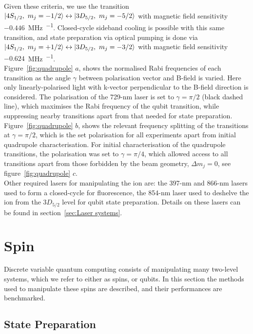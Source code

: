     Given these criteria, we use the transition $\ket{4S_{1/2},~m_j = -1/2} \leftrightarrow \ket{3D_{5/2},~m_j = -5/2}$ with magnetic field sensitivity 
    $-0.446$~\unit{\MHz\per\gauss}. Closed-cycle sideband cooling is possible with this same transition, and state preparation via optical pumping is done via $\ket{4S_{1/2},~m_j = +1/2} \leftrightarrow \ket{3D_{5/2},~m_j = -3/2}$ with magnetic field sensitivity $-0.624$~\unit{\MHz\per\gauss}. \\
    Figure~\ref{fig:quadrupole} $a$, shows the normalised Rabi frequencies of each transition as the angle $\gamma$ between polarisation vector and B-field is varied. Here only linearly-polarised light with k-vector perpendicular to the B-field direction is considered.
    The polarisation of the 729-nm laser is set to $\gamma = \pi/2$ (black dashed line), which maximises the Rabi frequency of the qubit transition, while suppressing nearby transitions apart from that needed for state preparation. 
    Figure~\ref{fig:quadrupole} $b$, shows the relevant frequency splitting of the transitions at $\gamma = \pi/2$, which is the set polarisation for all experiments apart from initial quadrupole characterisation.
    For initial characterisation of the quadrupole transitions, the polarisation was set to $\gamma = \pi/4$, which allowed access to all transitions apart from those forbidden by the beam geometry, $\Delta m_j = 0$, see figure~\ref{fig:quadrupole} $c$. \\
    Other required lasers for manipulating the ion are: the 397-nm and 866-nm lasers used to form a closed-cycle for fluorescence, the 854-nm laser used to deshelve the ion from the $3D_{5/2}$ level for qubit state preparation. Details on these lasers can be found in section~\ref{sec:Laser systems}.
    

\section{Spin}
\label{sec:Spin}
    Discrete variable quantum computing consists of manipulating many two-level
    systems, which we refer to either as spins, or qubits. In this section 
    the methods used to manipulate these spins are described, and their
    performances are benchmarked.\\

\subsection{State Preparation}
\label{sec:Stateprep}

